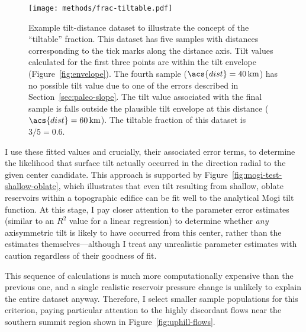 \begin{figure}
    \texttt{[image: methods/frac-tiltable.pdf]}%
    \caption[``Tiltable'' fraction]{Example tilt-distance dataset to illustrate the concept of the ``tiltable'' fraction. This dataset has five samples with distances corresponding to the tick marks along the distance axis. Tilt values calculated for the first three points are within the tilt envelope (Figure~\ref{fig:envelope}). The fourth sample ($\acs{dist} = \qty{40}{\km}$) has no possible tilt value due to one of the errors described in Section~\ref{sec:paleo-slope}. The tilt value associated with the final sample is falls outside the plausible tilt envelope at this distance ($\acs{dist} = \qty{60}{\km}$). The tiltable fraction of this dataset is $3/5 = 0.6$.}%
    \label{fig:frac-tiltable}
\end{figure}

I use these fitted values and crucially, their associated error terms, to determine the likelihood that surface tilt actually occurred in the direction radial to the given center candidate. This approach is supported by Figure~\ref{fig:mogi-test-shallow-oblate}, which illustrates that even tilt resulting from shallow, oblate reservoirs within a topographic edifice can be fit well to the analytical Mogi tilt function. At this stage, I pay closer attention to the parameter error estimates (similar to an $R^2$ value for a linear regression) to determine whether \emph{any} axisymmetric tilt is likely to have occurred from this center, rather than the estimates themselves---although I treat any unrealistic parameter estimates with caution regardless of their goodness of fit.

This sequence of calculations is much more computationally expensive than the previous one, and a single realistic reservoir pressure change is unlikely to explain the entire dataset anyway. Therefore, I select smaller sample populations for this criterion, paying particular attention to the highly discordant flows near the southern summit region shown in Figure~\ref{fig:uphill-flows}.